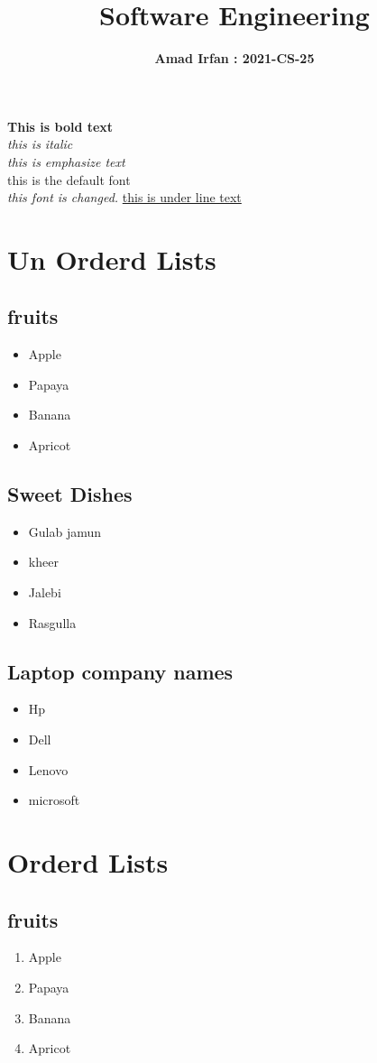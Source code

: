 \documentclass[12pt]{article}
\title{\textbf{ Software Engineering}}
\author{\textbf{Amad Irfan : 2021-CS-25 }}
\date{}
\begin{document}
\maketitle
\textbf{This is bold text}
\\
\textit{this is italic}
\\
\emph{this is emphasize text}
\\
this is the default font
\\
\textsl{this font is changed.}
\underline{this is under line text}
\newpage
\section*{Un Orderd Lists}
\subsection*{fruits}    
\begin{itemize}
    \item Apple
    \item Papaya
    \item Banana
    \item Apricot
\end{itemize}
\subsection*{Sweet Dishes}
\begin{itemize}
    \item Gulab jamun
    \item  kheer
    \item  Jalebi
    \item  Rasgulla
\end{itemize}
\subsection*{Laptop company names}
\begin{itemize}
    \item Hp
    \item Dell
    \item Lenovo
    \item microsoft
\end{itemize}
 \section*{Orderd Lists}
\subsection*{fruits}    
\begin{enumerate}
    \item Apple
    \item Papaya
    \item Banana
    \item Apricot
\end{enumerate}
\end{document}
